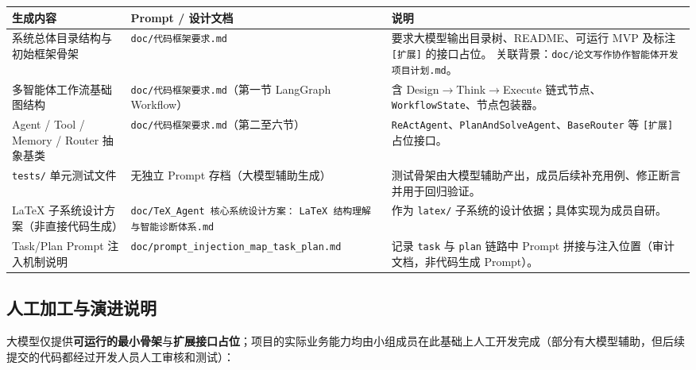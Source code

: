 \begin{longtable}{@{}>{\raggedright\arraybackslash}p{}>{\raggedright\arraybackslash}p{}>{\raggedright\arraybackslash}p{}@{}}
\toprule
\textbf{生成内容} & \textbf{Prompt / 设计文档} & \textbf{说明} \\
\midrule
\endhead
系统总体目录结构与初始框架骨架 &
\texttt{doc/代码框架要求.md} &
要求大模型输出目录树、README、可运行 MVP 及标注 \texttt{[扩展]} 的接口占位。
关联背景：\texttt{doc/论文写作协作智能体开发项目计划.md}。 \\

多智能体工作流基础图结构 &
\texttt{doc/代码框架要求.md}（第一节 LangGraph Workflow） &
含 Design$\rightarrow$Think$\rightarrow$Execute 链式节点、\texttt{WorkflowState}、节点包装器。 \\

Agent / Tool / Memory / Router 抽象基类 &
\texttt{doc/代码框架要求.md}（第二至六节） &
\texttt{ReActAgent}、\texttt{PlanAndSolveAgent}、\texttt{BaseRouter} 等
\texttt{[扩展]} 占位接口。 \\

\texttt{tests/} 单元测试文件 &
无独立 Prompt 存档（大模型辅助生成） &
测试骨架由大模型辅助产出，成员后续补充用例、修正断言并用于回归验证。 \\

LaTeX 子系统设计方案（非直接代码生成） &
\texttt{doc/TeX\_Agent 核心系统设计方案：}\newline
\texttt{LaTeX 结构理解与智能诊断体系.md} &
作为 \texttt{latex/} 子系统的设计依据；具体实现为成员自研。 \\

Task/Plan Prompt 注入机制说明 &
\texttt{doc/prompt\_injection\_map\_}\newline\texttt{task\_plan.md} &
记录 \texttt{task} 与 \texttt{plan} 链路中 Prompt 拼接与注入位置（审计文档，非代码生成 Prompt）。 \\
\bottomrule
\end{longtable}

\subsection{人工加工与演进说明}

大模型仅提供\textbf{可运行的最小骨架}与\textbf{扩展接口占位}；项目的实际业务能力均由小组成员在此基础上人工开发完成（部分有大模型辅助，但后续提交的代码都经过开发人员人工审核和测试）：

